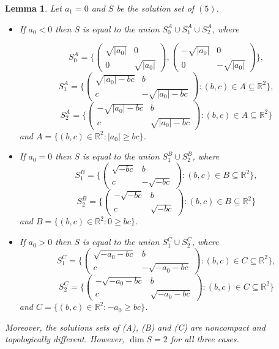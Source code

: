 \documentclass[12pt]{amsart}
\theoremstyle{plain}
\newtheorem{lem}[thm]{Lemma}
\theoremstyle{definition}
\begin{document}
\begin{lem} \label{lem_3} Let $a_1 = 0$ and $S$ be the solution set of $(5)$.
\begin{itemize}
\item[(A)] If $a_0 < 0$ then $S$ is equal to the union
$S^A_0 \cup S^A_1 \cup S^A_2$, where 

$$S^A_0 = \{\left(\begin{array}{rr}  \sqrt{|a_0|} & 0 \\ 0 & \sqrt{|a_0|}  \end{array}\right),
\left(\begin{array}{rr}  -\sqrt{|a_0|} & 0 \\ 0 & -\sqrt{|a_0|}  \end{array}\right)\},$$
$$S^A_1 = \{\left(\begin{array}{rr}  \sqrt{|a_0|-bc} & b \\ c & -\sqrt{|a_0|-bc}  \end{array}\right): (b,c) \in A \subseteq \mathbb R^2 \},$$
$$S^A_2 = \{\left(\begin{array}{rr}  -\sqrt{|a_0|-bc} & b \\ c & \sqrt{|a_0|-bc}  \end{array}\right): (b,c) \in A \subseteq \mathbb R^2 \}$$ and $A = \{(b,c) \in \mathbb R^2: |a_0| \geq bc \}$.

\item[(B)] If $a_0 = 0$ then $S$  is equal to the union
$S^B_1 \cup S^B_2$, where 
$$S^B_1 = \{\left(\begin{array}{rr}  \sqrt{-bc} & b \\ c & -\sqrt{-bc}  \end{array}\right): (b,c) \in B \subseteq \mathbb R^2 \},$$
$$S^B_2 = \{\left(\begin{array}{rr}  -\sqrt{-bc} & b \\ c & \sqrt{-bc}  \end{array}\right): (b,c) \in B \subseteq \mathbb R^2 \}$$ and $B= \{(b,c) \in \mathbb R^2: 0 \geq bc \}$.

\item[(C)] If $a_0 > 0$ then $S$  is equal to the union
$S^C_1 \cup S^C_2$, where 
$$S^C_1 = \{\left(\begin{array}{rr}  \sqrt{-a_0-bc} & b \\ c & -\sqrt{-a_0-bc}  \end{array}\right): (b,c) \in C \subseteq \mathbb R^2 \},$$
$$S^C_2 = \{\left(\begin{array}{rr}  -\sqrt{-a_0-bc} & b \\ c & \sqrt{-a_0-bc}  \end{array}\right): (b,c) \in C \subseteq \mathbb R^2 \}$$ and $C = \{(b,c) \in \mathbb R^2: -a_0 \geq bc \}$.
\end{itemize}
Moreover, the solutions sets of (A), (B) and (C) are noncompact and topologically different. However, $\dim S = 2$ for all three cases.
\end{lem}
\end{document}

